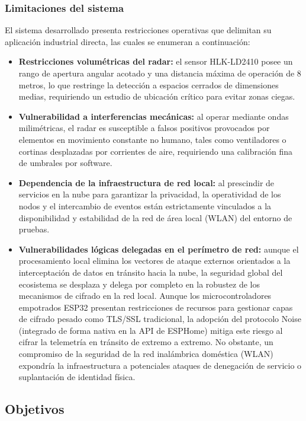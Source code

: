 \subsubsection{Limitaciones del sistema}
El sistema desarrollado presenta restricciones operativas que delimitan su aplicación industrial directa, las cuales se enumeran a continuación:
\begin{itemize}
    \item \textbf{Restricciones volumétricas del radar:} el sensor HLK-LD2410 posee un rango de apertura angular acotado y una distancia máxima de operación de 8 metros, lo que restringe la detección a espacios cerrados de dimensiones medias, requiriendo un estudio de ubicación crítico para evitar zonas ciegas.
    \item \textbf{Vulnerabilidad a interferencias mecánicas:} al operar mediante ondas milimétricas, el radar es susceptible a falsos positivos provocados por elementos en movimiento constante no humano, tales como ventiladores o cortinas desplazadas por corrientes de aire, requiriendo una calibración fina de umbrales por software.
    \item \textbf{Dependencia de la infraestructura de red local:} al prescindir de servicios en la nube para garantizar la privacidad, la operatividad de los nodos y el intercambio de eventos están estrictamente vinculados a la disponibilidad y estabilidad de la red de área local (WLAN) del entorno de pruebas.
    \item \textbf{Vulnerabilidades lógicas delegadas en el perímetro de red:} aunque el procesamiento local elimina los vectores de ataque externos orientados a la interceptación de datos en tránsito hacia la nube, la seguridad global del ecosistema se desplaza y delega por completo en la robustez de los mecanismos de cifrado en la red local. Aunque los microcontroladores empotrados ESP32 presentan restricciones de recursos para gestionar capas de cifrado pesado como TLS/SSL tradicional, la adopción del protocolo Noise (integrado de forma nativa en la API de ESPHome) mitiga este riesgo al cifrar la telemetría en tránsito de extremo a extremo. No obstante, un compromiso de la seguridad de la red inalámbrica doméstica (WLAN) expondría la infraestructura a potenciales ataques de denegación de servicio o suplantación de identidad física.
\end{itemize}

\subsection{Objetivos}

